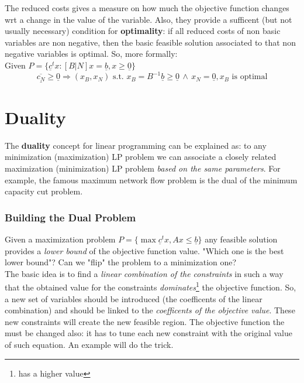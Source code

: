                 The reduced costs gives a measure on how much the objective function changes wrt a change in the value of the variable. Also, they provide a sufficent (but not usually necessary) condition for \textbf{optimality}: if all reduced costs of non basic variables are non negative, then the basic feasible solution associated to that non negative variables is optimal. So, more formally:\\
                Given $P = \{\underline{c}^tx : [B \vert N]x = \underline{b}, x \geq \underline{0}\}$
                \begin{equation}
                    \underline{\overline{c_N}} \geq \underline{0} \Rightarrow (x_B, x_N) \text{ s.t. } x_B = B^{-1}\underline{b} \geq \underline{0} \,\wedge\, x_N = \underline{0}, x_B \text{ is optimal}
                \end{equation}

    \section{Duality}
        The \textbf{duality} concept for linear programming can be explained as: to any minimization (maximization) LP problem we can associate a closely related maximization (minimization) LP problem \textit{based on the same parameters}. For example, the famous maximum network flow problem is the dual of the minimum capacity cut problem.

        \subsubsection{Building the Dual Problem}
            Given a maximization problem $P = \{\max \underline{c}^tx, Ax \leq \underline{b}\}$ any feasible solution provides a \textit{lower bound} of the objective function value. "Which one is the best lower bound"? Can we "flip" the problem to a minimization one?\\
            The basic idea is to find a \textit{linear combination of the constraints} in such a way that the obtained value for the constraints \textit{dominates}\footnote{has a higher value} the objective function. So, a new set of variables should be introduced (the coefficents of the linear combination) and should be linked to the \textit{coefficents of the objective value}. These new constraints will create the new feasible region. The objective function the must be changed also: it has to tune each new constraint with the original value of such equation. An example will do the trick.

